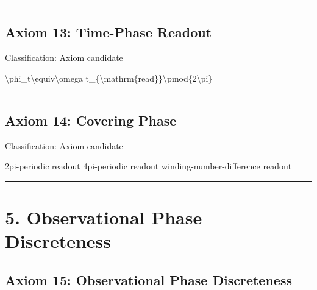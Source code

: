\documentclass[
  a4paper,
]{article}
\newenvironment{Shaded}{}{}
\newcommand{\NormalTok}[1]{#1}
\begin{document}
\begin{center}\rule{0.5\linewidth}{0.5pt}\end{center}

\subsection{Axiom 13: Time-Phase
Readout}\label{axiom-13-time-phase-readout}

Classification: Axiom candidate

\begin{Shaded}
\begin{Highlighting}[]
\NormalTok{\textbackslash{}phi\_t\textbackslash{}equiv\textbackslash{}omega t\_\{\textbackslash{}mathrm\{read\}\}\textbackslash{}pmod\{2\textbackslash{}pi\}}
\end{Highlighting}
\end{Shaded}

\begin{center}\rule{0.5\linewidth}{0.5pt}\end{center}

\subsection{Axiom 14: Covering Phase}\label{axiom-14-covering-phase}

Classification: Axiom candidate

\begin{Shaded}
\begin{Highlighting}[]
\NormalTok{2pi{-}periodic readout}
\NormalTok{4pi{-}periodic readout}
\NormalTok{winding{-}number{-}difference readout}
\end{Highlighting}
\end{Shaded}

\begin{center}\rule{0.5\linewidth}{0.5pt}\end{center}

\section{5. Observational Phase
Discreteness}\label{observational-phase-discreteness}

\subsection{Axiom 15: Observational Phase
Discreteness}\label{axiom-15-observational-phase-discreteness}
\end{document}
